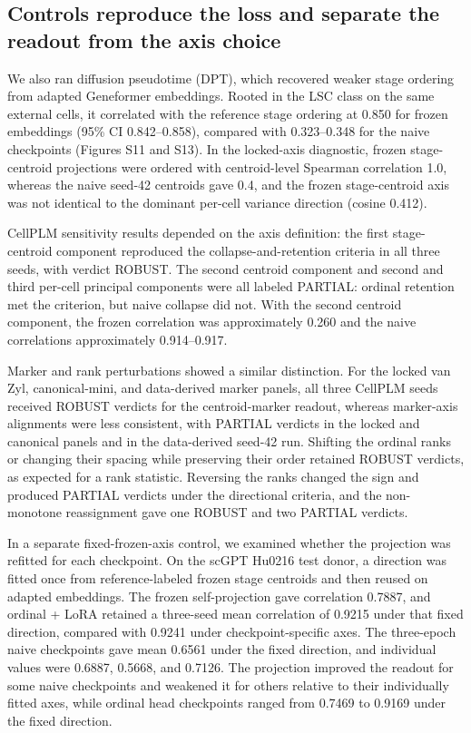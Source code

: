 \documentclass[12pt,letterpaper]{article}
\begin{document}
\subsection*{Controls reproduce the loss and separate the readout from the axis choice}

We also ran diffusion pseudotime (DPT), which recovered weaker stage ordering from adapted Geneformer embeddings. Rooted in the LSC class on the same external cells, it correlated with the reference stage ordering at 0.850 for frozen embeddings (95\% CI 0.842--0.858), compared with 0.323--0.348 for the naive checkpoints (Figures S11 and S13). In the locked-axis diagnostic, frozen stage-centroid projections were ordered with centroid-level Spearman correlation 1.0, whereas the naive seed-42 centroids gave 0.4, and the frozen stage-centroid axis was not identical to the dominant per-cell variance direction (cosine 0.412).

CellPLM sensitivity results depended on the axis definition: the first stage-centroid component reproduced the collapse-and-retention criteria in all three seeds, with verdict ROBUST. The second centroid component and second and third per-cell principal components were all labeled PARTIAL: ordinal retention met the criterion, but naive collapse did not. With the second centroid component, the frozen correlation was approximately 0.260 and the naive correlations approximately 0.914--0.917.

Marker and rank perturbations showed a similar distinction. For the locked van Zyl, canonical-mini, and data-derived marker panels, all three CellPLM seeds received ROBUST verdicts for the centroid-marker readout, whereas marker-axis alignments were less consistent, with PARTIAL verdicts in the locked and canonical panels and in the data-derived seed-42 run. Shifting the ordinal ranks or changing their spacing while preserving their order retained ROBUST verdicts, as expected for a rank statistic. Reversing the ranks changed the sign and produced PARTIAL verdicts under the directional criteria, and the non-monotone reassignment gave one ROBUST and two PARTIAL verdicts.

In a separate fixed-frozen-axis control, we examined whether the projection was refitted for each checkpoint. On the scGPT Hu0216 test donor, a direction was fitted once from reference-labeled frozen stage centroids and then reused on adapted embeddings. The frozen self-projection gave correlation 0.7887, and ordinal + LoRA retained a three-seed mean correlation of 0.9215 under that fixed direction, compared with 0.9241 under checkpoint-specific axes. The three-epoch naive checkpoints gave mean 0.6561 under the fixed direction, and individual values were 0.6887, 0.5668, and 0.7126. The projection improved the readout for some naive checkpoints and weakened it for others relative to their individually fitted axes, while ordinal head checkpoints ranged from 0.7469 to 0.9169 under the fixed direction.
\end{document}
